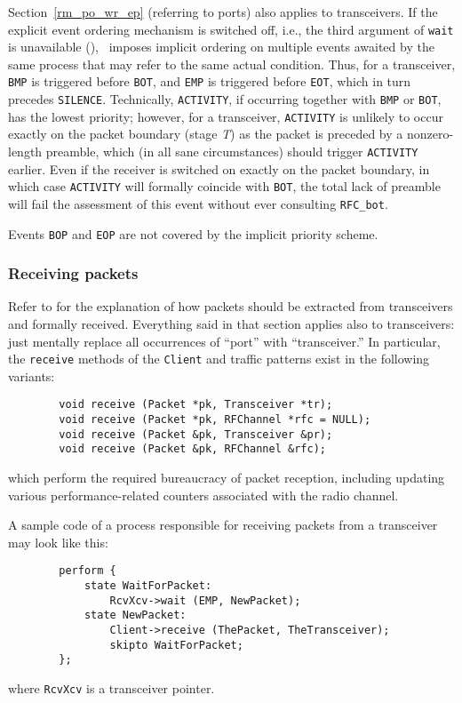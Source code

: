 Section~\ref{rm_po_wr_ep} (referring to ports) also applies to
transceivers.
If the explicit event ordering mechanism is switched off, i.e.,
the third argument of {\tt wait} is unavailable (),
\smurph\ imposes implicit ordering on multiple events awaited by the
same process that may refer to the same actual condition.
Thus, for a transceiver,
{\tt BMP} is triggered before {\tt BOT}, and {\tt EMP} is triggered
before {\tt EOT}, which in turn precedes {\tt SILENCE}.
Technically, {\tt ACTIVITY}, if occurring together with {\tt BMP} or
{\tt BOT}, has the lowest priority; however, for a transceiver, 
{\tt ACTIVITY} is unlikely to occur exactly on the packet boundary
(stage {\em T\/}) as the packet is preceded by a nonzero-length preamble,
which (in all sane circumstances) should trigger {\tt ACTIVITY} earlier.
Even if the receiver is switched on exactly on the packet boundary, in
which case {\tt ACTIVITY} will formally coincide with {\tt BOT},
the total lack of preamble will fail the assessment of this event
without ever consulting {\tt RFC\_bot}.

Events {\tt BOP} and {\tt EOP} are not covered by the implicit
priority scheme.

\subsubsection{Receiving packets}
\label{rm_tr_pp_rp}

Refer to  for the explanation of how packets should be
extracted from transceivers and formally received.
Everything said in that section applies also to transceivers: just mentally
replace all occurrences of ``port'' with ``transceiver.''
In particular, the {\tt receive} methods of the {\tt Client} and
traffic patterns exist in the following variants:
\begin{verbatim}
        void receive (Packet *pk, Transceiver *tr);
        void receive (Packet *pk, RFChannel *rfc = NULL);
        void receive (Packet &pk, Transceiver &pr);
        void receive (Packet &pk, RFChannel &rfc);
\end{verbatim}
\noindent
which perform the required bureaucracy of packet reception, including updating
various performance-related counters associated with the radio channel.

A sample code of a process responsible for receiving packets from a transceiver
may look like this:
\begin{verbatim}
        perform {
            state WaitForPacket:
                RcvXcv->wait (EMP, NewPacket);
            state NewPacket:
                Client->receive (ThePacket, TheTransceiver);
                skipto WaitForPacket;
        };
\end{verbatim}
\noindent
where {\tt RcvXcv} is a transceiver pointer.

